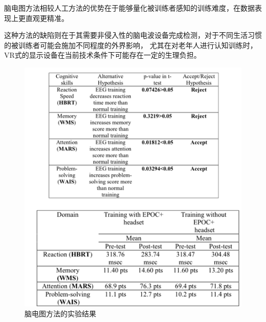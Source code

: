 \documentclass[12pt]{article}
\begin{document}
            脑电图方法相较人工方法的优势在于能够量化被训练者感知的训练难度，在数据表现上更直观更精准。

            这种方法的缺陷则在于其需要非侵入性的脑电波设备完成检测，对于不同生活习惯的被训练者可能会施加不同程度的外界影响，
            尤其在对老年人进行认知训练时，VR式的显示设备在当前技术条件下可能存在一定的生理负担。
            \begin{figure}[H]
            	\centering
            	\includegraphics[scale=0.8]{images/brain_data.png}
            	\caption{脑电图方法的实验结果}
            	\label{fig:label}
            \end{figure}
\end{document}
